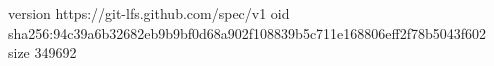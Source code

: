 version https://git-lfs.github.com/spec/v1
oid sha256:94c39a6b32682eb9b9bf0d68a902f108839b5c711e168806eff2f78b5043f602
size 349692
